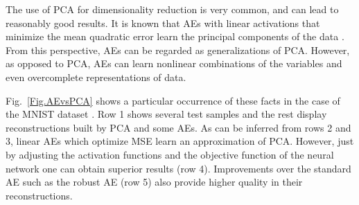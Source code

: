 The use of PCA for dimensionality reduction is very common, and can lead to reasonably good results. It is known that AEs with linear activations that minimize the mean quadratic error learn the principal components of the data \cite{ANNsPCA}. From this perspective, AEs can be regarded as generalizations of PCA. However, as opposed to PCA, AEs can learn nonlinear combinations of the variables and even overcomplete representations of data.

Fig.~\ref{Fig.AEvsPCA} shows a particular occurrence of these facts in the case of the MNIST dataset \cite{MNIST}. Row 1 shows several test samples and the rest display reconstructions built by PCA and some AEs. As can be inferred from rows 2 and 3, linear AEs which optimize MSE learn an approximation of PCA. However, just by adjusting the activation functions and the objective function of the neural network one can obtain superior results (row 4). Improvements over the standard AE such as the robust AE (row 5) also provide higher quality in their reconstructions.


